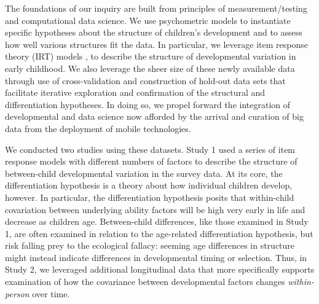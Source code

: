 \documentclass[man, floatsintext]{apa7}
\begin{document}
The foundations of our inquiry are built from  principles of
measurement/testing and computational data science. We use psychometric
models to instantiate specific hypotheses about the structure of children's development
and to assess how well various structures ﬁt the data. In particular, we
leverage item response theory (IRT) models \parencite[first developed by
Educational Testing Service to measure students' academic performance;][]{lord1980}, to describe the structure of developmental variation in early
childhood. We also leverage the sheer size of these newly available data
through use of cross-validation and construction of hold-out data sets
that facilitate iterative exploration and confirmation of the structural
and differentiation hypotheses. In doing so, we propel forward the
integration of developmental and data science now afforded by the
arrival and curation of big data from the deployment of mobile technologies.

We conducted two studies using these datasets. Study 1 used a series
of item response models with different numbers of factors to describe
the structure of between-child developmental variation in the survey
data.
At its core, the differentiation hypothesis is a theory about how
individual children develop, however. In particular, the differentiation
hypothesis posits that within-child covariation between underlying ability
factors will be high very early in life and decrease as children age.
Between-child differences, like those examined in Study 1, are often
examined in relation to the age-related differentiation hypothesis, but
risk falling prey to the ecological fallacy: seeming age differences in structure might
instead indicate differences in developmental timing or selection. Thus,
in Study 2, we leveraged additional longitudinal data that more
specifically supports examination of how the covariance between
developmental factors changes \emph{within-person} over time.
\end{document}
